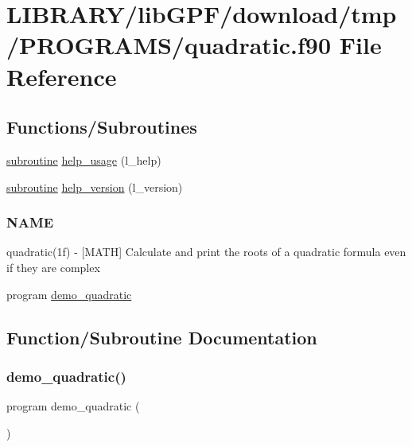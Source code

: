 \hypertarget{quadratic_8f90}{}\section{L\+I\+B\+R\+A\+R\+Y/lib\+G\+P\+F/download/tmp/\+P\+R\+O\+G\+R\+A\+M\+S/quadratic.f90 File Reference}
\label{quadratic_8f90}
\subsection*{Functions/\+Subroutines}
\begin{DoxyCompactItemize}
\item 
\hyperlink{M__stopwatch_83_8txt_acfbcff50169d691ff02d4a123ed70482}{subroutine} \hyperlink{quadratic_8f90_a3e09a3b52ee8fb04eeb93fe5761626a8}{help\+\_\+usage} (l\+\_\+help)
\item 
\hyperlink{M__stopwatch_83_8txt_acfbcff50169d691ff02d4a123ed70482}{subroutine} \hyperlink{quadratic_8f90_a39c21619b08a3c22f19e2306efd7f766}{help\+\_\+version} (l\+\_\+version)
\begin{DoxyCompactList}\small\item\em \subsubsection*{N\+A\+ME}

quadratic(1f) -\/ \mbox{[}M\+A\+TH\mbox{]} Calculate and print the roots of a quadratic formula even if they are complex \end{DoxyCompactList}\item 
program \hyperlink{quadratic_8f90_a70f6d33f92261a5c0c975b0272b23140}{demo\+\_\+quadratic}
\end{DoxyCompactItemize}


\subsection{Function/\+Subroutine Documentation}
\mbox{\label{quadratic_8f90_a70f6d33f92261a5c0c975b0272b23140}} 
\subsubsection{\texorpdfstring{demo\+\_\+quadratic()}{demo\_quadratic()}}
{\footnotesize\ttfamily program demo\+\_\+quadratic (\begin{DoxyParamCaption}{ }\end{DoxyParamCaption})}



